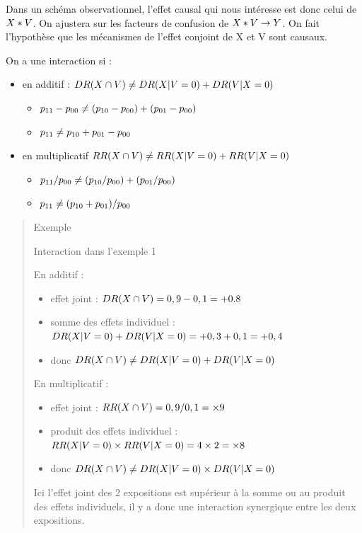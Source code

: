 \documentclass[
]{book}
\providecommand{\tightlist}{%
  \setlength{\itemsep}{0pt}\setlength{\parskip}{0pt}}
\begin{document}
Dans un schéma observationnel, l'effet causal qui nous intéresse est donc celui de \(\small X*V\). On ajustera sur les facteurs de confusion de \(\small X*V \rightarrow Y\).
On fait l'hypothèse que les mécanismes de l'effet conjoint de X et V sont causaux.

On a une interaction si :

\begin{itemize}
\tightlist
\item
  en additif : \(\small DR(X \cap V) \neq DR(X| V=0) + DR(V| X=0)\)

  \begin{itemize}
  \tightlist
  \item
    \(\small p_{11}-p_{00} \neq (p_{10}-p_{00})+(p_{01}-p_{00})\)
  \item
    \(\small p_{11} \neq p_{10} + p_{01} - p_{00}\)
  \end{itemize}
\item
  en multiplicatif \(\small RR(X \cap V) \neq RR(X| V=0) + RR(V| X=0)\)

  \begin{itemize}
  \tightlist
  \item
    \(\small p_{11}/p_{00} \neq (p_{10}/p_{00})+(p_{01}/p_{00})\)
  \item
    \(\small p_{11} \neq (p_{10} + p_{01}) / p_{00}\)
  \end{itemize}
\end{itemize}

\begin{quote}
Exemple

Interaction dans l'exemple 1

En additif :

\begin{itemize}
\tightlist
\item
  effet joint : \(\small DR(X \cap V) = 0,9 - 0,1 = +0.8\)
\item
  somme des effets individuel : \(\small DR(X| V=0) + DR(V| X=0) = +0,3 +0,1 = +0,4\)
\item
  donc \(\small DR(X \cap V) \neq DR(X| V=0) + DR(V| X=0)\)
\end{itemize}

En multiplicatif :

\begin{itemize}
\tightlist
\item
  effet joint : \(\small RR(X \cap V) = 0,9/0,1 = \times 9\)
\item
  produit des effets individuel : \(\small RR(X | V=0) \times RR(V | X=0) = 4 \times 2 = \times 8\)
\item
  donc \(\small DR(X \cap V) \neq DR(X| V=0) \times DR(V| X=0)\)
\end{itemize}

Ici l'effet joint des 2 expositions est supérieur à la somme ou au produit des effets individuels, il y a donc une interaction synergique entre les deux expositions.
\end{quote}
\end{document}
